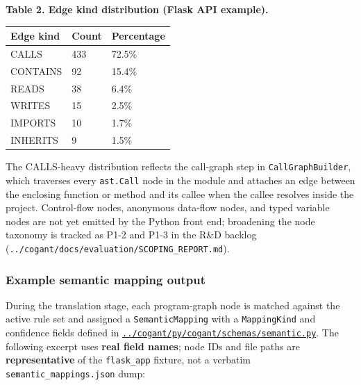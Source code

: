 \documentclass[
]{article}
\newcounter{none} %
\begin{document}
\textbf{Table 2. Edge kind distribution (Flask API example).}

{\def\LTcaptype{none} %
\begin{longtable}[]{@{}lll@{}}
\toprule\noalign{}
Edge kind & Count & Percentage \\
\midrule\noalign{}
\endhead
\bottomrule\noalign{}
\endlastfoot
CALLS & 433 & 72.5\% \\
CONTAINS & 92 & 15.4\% \\
READS & 38 & 6.4\% \\
WRITES & 15 & 2.5\% \\
IMPORTS & 10 & 1.7\% \\
INHERITS & 9 & 1.5\% \\
\end{longtable}
}

The CALLS-heavy distribution reflects the call-graph step in
\texttt{CallGraphBuilder}, which traverses every \texttt{ast.Call} node
in the module and attaches an edge between the enclosing function or
method and its callee when the callee resolves inside the project.
Control-flow nodes, anonymous data-flow nodes, and typed variable nodes
are not yet emitted by the Python front end; broadening the node
taxonomy is tracked as P1-2 and P1-3 in the R\&D backlog
(\texttt{../cogant/docs/evaluation/SCOPING\_REPORT.md}).

\subsubsection{Example semantic mapping
output}\label{example-semantic-mapping-output}

During the translation stage, each program-graph node is matched against
the active rule set and assigned a \texttt{SemanticMapping} with a
\texttt{MappingKind} and confidence fields defined in
\href{../cogant/py/cogant/schemas/semantic.py}{\texttt{../cogant/py/cogant/schemas/semantic.py}}.
The following excerpt uses \textbf{real field names}; node IDs and file
paths are \textbf{representative} of the \texttt{flask\_app} fixture,
not a verbatim \texttt{semantic\_mappings.json} dump:
\end{document}
